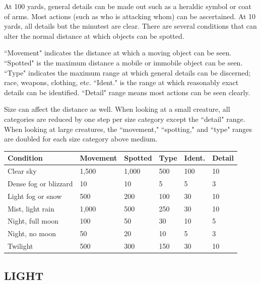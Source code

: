 \begin{multicols}{2}
At 100 yards, general details can be made out such as a heraldic symbol or coat of arms.  Most actions (such as who is attacking whom) can be ascertained.  At 10 yards, all details but the minutest are clear.  There are several conditions that can alter the normal distance at which objects can be spotted.

``Movement" indicates the distance at which a moving object can be seen.  ``Spotted" is the maximum distance a mobile or immobile object can be seen.  ``Type" indicates the maximum range at which general details can be discerned; race, weapons, clothing, etc.  ``Ident." is the range at which reasonably exact details can be identified.  ``Detail" range means most actions can be seen clearly.

Size can affect the distance as well.  When looking at a small creature, all categories are reduced by one step per size category except the ``detail" range.  When looking at large creatures, the ``movement," ``spotting," and ``type" ranges are doubled for each size category above medium.

\noindent
\begin{minipage}{\columnwidth}

\label{visranges}
\noindent
\begin{tabular}{|p{}|p{}|p{}|p{}|p{}|p{}|}
\hline
Condition				& Move\-ment	& Spot\-ted	& Type		& Ident.	& Detail \\
\hline\hline
\rowcolor[gray]{.9}Clear sky				& 1,500		& 1,000		& 500		& 100		& 10 \\
Dense fog or blizzard	& 10		& 10		& 5			& 5			& 3 \\
\rowcolor[gray]{.9}Light fog or snow		& 500		& 200		& 100		& 30		& 10 \\
Mist, light rain		& 1,000		& 500		& 250		& 30		& 10 \\
\rowcolor[gray]{.9}Night, full moon		& 100		& 50		& 30		& 10		& 5 \\
Night, no moon			& 50		& 20		& 10		& 5			& 3 \\
\rowcolor[gray]{.9}Twilight				& 500		& 300		& 150		& 30		& 10 \\
\hline
\end{tabular}

\end{minipage}

\subsection{LIGHT}


\end{multicols}

